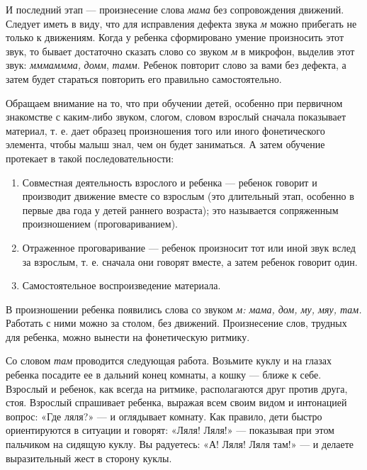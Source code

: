 \documentclass{book}
\renewcommand{\emph}[1]{\textit{#1}}
\begin{document}
И последний этап --- произнесение слова \emph{мама} без сопровождения
движений. Следует иметь в виду, что для исправления дефекта звука
\emph{м} можно прибегать не только к движениям. Когда у ребенка
сформировано умение произносить этот звук, то бывает достаточно сказать
слово со звуком \emph{м} в микрофон, выделив этот звук: \emph{мммаммма,}
\emph{домм}, \emph{тамм}. Ребенок повторит слово за вами без дефекта, а
затем будет стараться повторить его правильно самостоятельно.

Обращаем внимание на то, что при обучении детей, особенно при первичном
знакомстве с каким-либо звуком, слогом, словом взрослый сначала
показывает материал, т. е. дает образец произношения того или иного
фонетического элемента, чтобы малыш знал, чем он будет заниматься. А
затем обучение протекает в такой последовательности:


\begin{enumerate}
\def\labelenumi{\arabic{enumi}.}
\item
  
  Совместная деятельность взрослого и ребенка --- ребенок говорит и
  производит движение вместе со взрослым (это длительный этап, особенно
  в первые два года у детей раннего возраста); это называется
  сопряженным произношением (проговариванием).
  
\item
  
  Отраженное проговаривание --- ребенок произносит тот или иной звук
  вслед за взрослым, т. е. сначала они говорят вместе, а затем ребенок
  говорит один.
  
\item
  
  Самостоятельное воспроизведение материала.
  
\end{enumerate}


В произношении ребенка появились слова со звуком \emph{м: мама, дом, му,
мяу, там.} Работать с ними можно за столом, без движений. Произнесение
слов, трудных для ребенка, можно вынести на фонетическую ритмику.

Со словом \emph{там} проводится следующая работа. Возьмите куклу и на
глазах ребенка посадите ее в дальний конец комнаты, а кошку --- ближе к
себе. Взрослый и ребенок, как всегда на ритмике, располагаются друг
против друга, стоя. Взрослый спрашивает ребенка, выражая всем своим
видом и интонацией вопрос: «Где ляля?» --- и оглядывает комнату. Как
правило, дети быстро ориентируются в ситуации и говорят: «Ляля! Ляля!»
--- показывая при этом пальчиком на сидящую куклу. Вы радуетесь: «А!
Ляля! Ляля там!» --- и делаете выразительный жест в сторону куклы.
\end{document}
